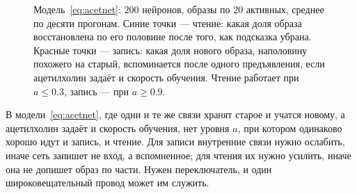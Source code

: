 \begin{figure}[t]
\centering
{}
\caption{Модель~\eqref{eq:acetnet}: $200$ нейронов, образы по $20$ активных, среднее по десяти прогонам. Синие точки --- чтение: какая доля образа восстановлена по его половине после того, как подсказка убрана. Красные точки --- запись: какая доля нового образа, наполовину похожего на старый, вспоминается после одного предъявления, если ацетилхолин задаёт и скорость обучения. Чтение работает при $a\le0.3$, запись --- при $a\ge0.9$.}
\label{fig:acetsim}
\end{figure}

\begin{keyblock}
\begin{proposition}
\label{prop:writeread}
В модели~\eqref{eq:acetnet}, где одни и те же связи хранят старое и учатся новому, а ацетилхолин задаёт и скорость обучения, нет уровня $a$, при котором одинаково хорошо идут и запись, и чтение. Для записи внутренние связи нужно ослабить, иначе сеть запишет не вход, а вспомненное; для чтения их нужно усилить, иначе она не допишет образ по части. Нужен переключатель, и один широковещательный провод может им служить.
\end{proposition}
\end{keyblock}

